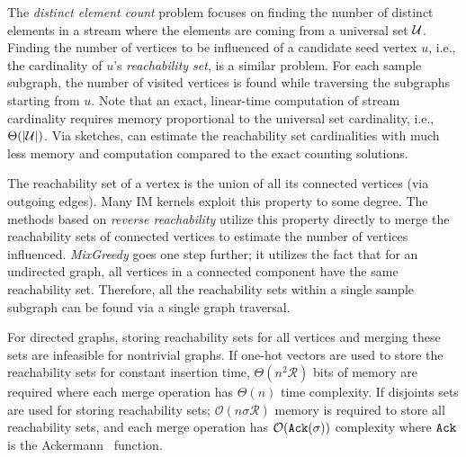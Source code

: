 \documentclass[final,5p,times,twocolumn]{elsarticle}
\newcommand\acro{{\sc{HyperFuseR\xspace}\xspace}\xspace}
\newcommand\kktodo[1]{\textcolor{red}{#1}}
\newcommand\ggx[1]{\textcolor{blue}{#1}}
\begin{document}
The {\em distinct element count} problem focuses on finding the number of distinct elements in a stream where the elements are coming from a universal set ${\cal U}$. Finding the number of vertices to be influenced of a candidate seed vertex $u$, i.e., the cardinality of $u$'s {\em reachability set}, is a similar problem. For each sample subgraph, the number of visited vertices is found while traversing the subgraphs starting from $u$. Note that an exact, linear-time computation of stream cardinality requires memory proportional to the universal set cardinality, i.e., ${\Theta}(|{\cal U}|)$. Via sketches, \acro can estimate the reachability set cardinalities with much less memory and computation compared to the exact counting solutions. 

The reachability set of a vertex is the union of all its connected vertices (via outgoing edges). Many IM kernels exploit this property to some degree. The methods based on {\em reverse reachability} \cite{borgs2014maximizing} %
utilize this property directly to merge the reachability sets of connected vertices to estimate the number of vertices influenced. {\em MixGreedy} \cite{MixGreedy} %
goes one step further; it utilizes the fact that for an undirected graph, all vertices in a connected component have the same reachability set. Therefore, all the reachability sets within a single sample subgraph can be found via a single graph traversal. 

For directed graphs, storing reachability sets for all vertices and merging these sets are infeasible for nontrivial graphs. 
If one-hot vectors are used to store the reachability sets for constant insertion time, $\Theta(n^2\mathcal{R})$ bits of memory are required where each merge operation has $\Theta(n)$ time complexity. 
If disjoints sets are used for storing reachability sets; $\mathcal{O}(n{\sigma}\mathcal{R})$ 
memory is required to store all reachability sets, and each merge operation has $\mathcal{O}({\tt Ack}(\sigma))$ complexity where ${\tt Ack}$ is the Ackermann~\cite{ackermann} function. %
\end{document}
